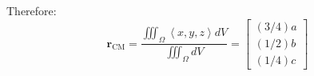 \documentclass{article}
\newcommand{\rowvec}[3]{\left\langle #1, #2, #3 \right\rangle}
\newcommand{\colvec}[3]{\begin{bmatrix} #1 \\ #2 \\ #3 \end{bmatrix}}
\newcommand{\at}[1]{\left. #1 \right|}
\newcommand{\dr}[1]{\textcolor{dark_red}{#1}}
\begin{document}
\dr{
Therefore:
\[\mathbf{r}_{\text{CM}} = \frac{\iiint_{\Omega} \rowvec{x}{y}{z}dV}{\iiint_{\Omega} dV} = \colvec{(3/4)a}{(1/2)b}{(1/4)c}\]
}

%
%
\end{document}
